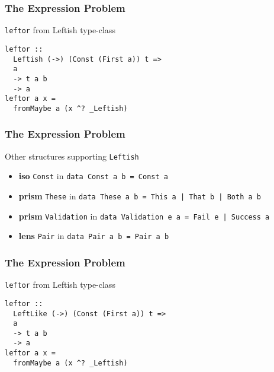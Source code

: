 \begin{frame}[fragile]
\frametitle{The Expression Problem}
\begin{block}{\lstinline{leftor} from Leftish type-class}
\begin{lstlisting}[style=haskell,mathescape]
leftor ::
  Leftish (->) (Const (First a)) t =>
  a
  -> t a b
  -> a 
leftor a x =
  fromMaybe a (x ^? _Leftish)
\end{lstlisting}
\end{block}
\end{frame}

\begin{frame}[fragile]
\frametitle{The Expression Problem}
\begin{block}{Other structures supporting \lstinline{Leftish}}
\tiny{
\begin{itemize}
\item \textbf{iso} \lstinline[style=haskell]{Const} in \lstinline[style=haskell]{data Const a b = Const a}
\item \textbf{prism} \lstinline[style=haskell]{These} in \lstinline[style=haskell]{data These a b = This a | That b | Both a b}
\item \textbf{prism} \lstinline[style=haskell]{Validation} in \lstinline[style=haskell]{data Validation e a = Fail e | Success a}
\item \textbf{lens} \lstinline[style=haskell]{Pair} in \lstinline[style=haskell]{data Pair a b = Pair a b}
\end{itemize}
}
\end{block}
\end{frame}

\begin{frame}[fragile]
\frametitle{The Expression Problem}
\begin{block}{\lstinline{leftor} from Leftish type-class}
\begin{lstlisting}[style=haskell,mathescape]
leftor ::
  LeftLike (->) (Const (First a)) t =>
  a
  -> t a b
  -> a 
leftor a x =
  fromMaybe a (x ^? _Leftish)
\end{lstlisting}
\end{block}
\end{frame}
